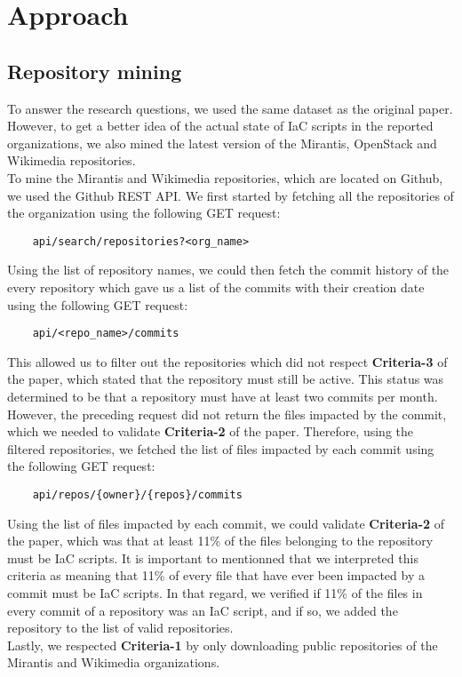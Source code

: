 
\section{Approach}
\label{sec:approach}
\subsection{Repository mining}
To answer the research questions, we used the same dataset as the original paper. However, to get a better idea of the actual state of IaC scripts in the reported organizations, we also mined the latest version of the Mirantis, OpenStack and Wikimedia repositories. \\
To mine the Mirantis and Wikimedia repositories, which are located on Github, we used the Github REST API. We first started by fetching all the repositories of the organization using the following GET request:

\begin{verbatim}
    api/search/repositories?<org_name>
\end{verbatim}

Using the list of repository names, we could then fetch the commit history of the every repository which gave us a list of the commits with their creation date using the following GET request:

\begin{verbatim}
    api/<repo_name>/commits
\end{verbatim}

This allowed us to filter out the repositories which did not respect \textbf{Criteria-3} of the paper, which stated that the repository must still be active. This status was determined to be that a repository must have at least two commits per month. \\
However, the preceding request did not return the files impacted by the commit, which we needed to validate \textbf{Criteria-2} of the paper. Therefore, using the filtered repositories, we fetched the list of files impacted by each commit using the following GET request:

\begin{verbatim}
    api/repos/{owner}/{repos}/commits
\end{verbatim}

Using the list of files impacted by each commit, we could validate \textbf{Criteria-2} of the paper, which was that at least 11\% of the files belonging to the repository must be IaC scripts. It is important to mentionned that we interpreted this criteria as meaning that 11\% of every file that have ever been impacted by a commit must be IaC scripts. In that regard, we verified if 11\% of the files in every commit of a repository was an IaC script, and if so, we added the repository to the list of valid repositories. \\
Lastly, we respected \textbf{Criteria-1} by only downloading public repositories of the Mirantis and Wikimedia organizations. \\

